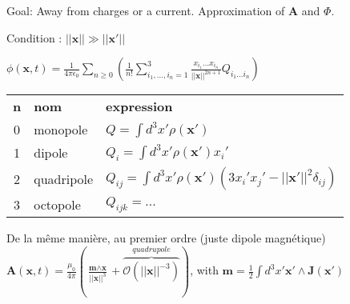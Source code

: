 Goal: Away from charges or a current. Approximation of \textbf{A} and $\Phi$.

Condition : $||\textbf{x}|| \gg ||\textbf{x}'||$
\squishlist
    \item $\phi(\textbf{x}, t) = \frac{1}{4\pi\epsilon_0}\sum_{n\geq0}\left(\frac{1}{n!}\sum_{i_1,...,i_n = 1}^{3}\frac{x_{i_1}...x_{i_n}}{||\textbf{x}||^{2n+1}}Q_{i_1...i_n}\right)$ \\ 
        \begin{tabular}{c | l l}
                \textbf{n} & \textbf{nom} & \textbf{expression} \\
                0 & monopole & $Q = \int d^3x' \rho (\textbf{x}')$ \\
                1 & dipole & $Q_i = \int d^3x' \rho (\textbf{x}') x_i'$ \\
                2 & quadripole & $Q_{ij} = \int d^3x' \rho (\textbf{x}') (3x_i'x_j' - ||\textbf{x}'||^2\delta_{ij})$ \\
                3 & octopole & $Q_{ijk} = ...$
        \end{tabular}
    \item De la même manière, au premier ordre (juste dipole magnétique) \\ $\textbf{A}(\textbf{x},t) =  \frac{\mu_0}{4\pi}(\frac{\textbf{m}\wedge\textbf{x}}{||\textbf{x}||^3} + \overbrace{\mathcal{O}(||\textbf{x}||^{-3})}^{quadrupole})$, with $\textbf{m} = \frac{1}{2}\int d^3x' \textbf{x}'\wedge \textbf{J}(\textbf{x}')$
\squishend 

